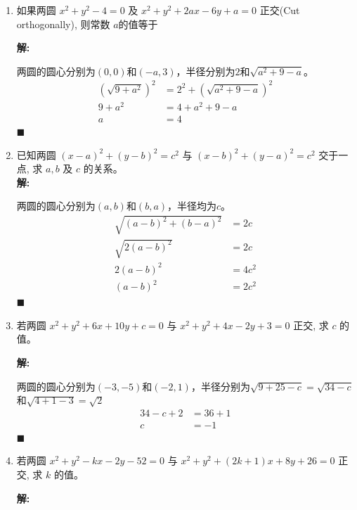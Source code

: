 \documentclass[10pt]{article}
\newcommand{\sol}{\textbf{解:} }
\begin{document}
\begin{enumerate}[leftmargin=*]
  \item 如果两圆 $x^{2}+y^{2}-4=0$ 及 $x^{2}+y^{2}+2 a x-6 y+a=0$ 正交(Cut orthogonally), 则常数 $a$的值等于

        \sol{}

        两圆的圆心分别为$(0, 0)$和$\left(-a, 3\right)$，半径分别为$2$和$\sqrt{a^2 + 9 - a}$。
        \begin{align*}
          \left(\sqrt{9 + a^2}\right)^2 & = 2^2 + \left(\sqrt{a^2 + 9 - a}\right)^2 \\
          9 + a^2                       & = 4 + a^2 + 9 - a                         \\
          a                             & = 4
        \end{align*} \hfill$\blacksquare$

  \item 已知两圆 $(x-a)^{2}+(y-b)^{2}=c^{2}$ 与 $(x-b)^{2}+(y-a)^{2}=c^{2}$ 交于一点, 求 $a, b$ 及 $c$ 的关系。\\

        \sol{}

        两圆的圆心分别为$(a, b)$和$(b, a)$，半径均为$c$。
        \begin{align*}
          \sqrt{(a - b)^{2} + (b - a)^{2}} & = 2c     \\
          \sqrt{2(a - b)^{2}}              & = 2c     \\
          2(a - b)^{2}                     & = 4c^{2} \\
          (a - b)^{2}                      & = 2c^{2}
        \end{align*} \hfill$\blacksquare$

  \item 若两圆 $x^{2}+y^{2}+6 x+10 y+c=0$ 与 $x^{2}+y^{2}+4 x-2 y+3=0$ 正交, 求 $c$ 的值。

        \sol{}

        两圆的圆心分别为$(-3, -5)$和$(-2, 1)$，半径分别为$\sqrt{9 + 25 - c} = \sqrt{34 - c}$和$\sqrt{4 + 1 - 3} = \sqrt{2}$
        \begin{align*}
          34 - c + 2 & = 36 + 1 \\
          c          & = -1
        \end{align*} \hfill$\blacksquare$

  \item 若两圆 $x^{2}+y^{2}-k x-2 y-52=0$ 与 $x^{2}+y^{2}+(2 k+1) x+8 y+26=0$ 正交, 求 $k$ 的值。

        \sol{}


\end{enumerate}
\end{document}
